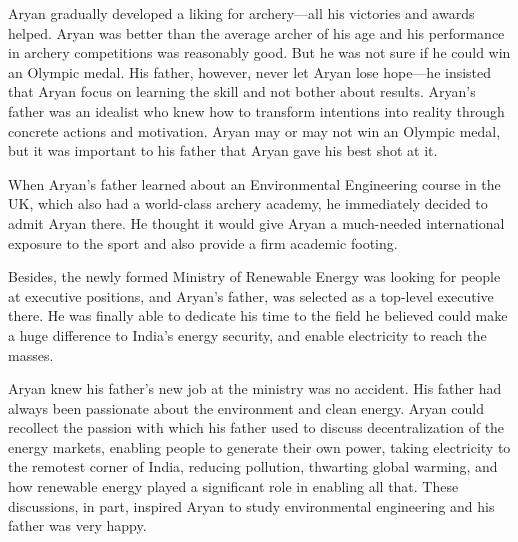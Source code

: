 Aryan gradually developed a liking for archery—all his victories and
awards helped. Aryan was better than the average archer of his age and his
performance in archery competitions was reasonably good. But he was not sure
if he could win an Olympic medal. His father, however, never let Aryan
lose hope—he insisted that Aryan focus on learning the skill and not bother
about results. Aryan's father was an idealist who knew how to transform
intentions into reality through concrete actions and motivation. Aryan may or may
not win an Olympic medal, but it was important to his father that Aryan gave his
best shot at it.

When Aryan's father learned about an Environmental Engineering course in
the UK, which also had a world-class archery academy, he immediately decided to admit
Aryan there. He thought it would give Aryan a much-needed international exposure
to the sport and also provide a firm academic footing.

Besides, the newly formed Ministry of Renewable Energy was looking for people at
executive positions, and Aryan's father, was selected as a top-level
executive there. He was finally able to dedicate his time to the field he believed
could make a huge difference to India's energy security, and enable electricity
to reach the masses.

Aryan knew his father's new job at the ministry was no
accident. His father had always been passionate about the environment and clean
energy. Aryan could recollect the passion with which his father used to discuss decentralization of the energy markets, enabling people to generate
their own power, taking electricity to the remotest corner of India, reducing
pollution, thwarting global warming, and how renewable energy played a
significant role in enabling all that. These discussions, in part, inspired
Aryan to study environmental engineering and his father was very happy.